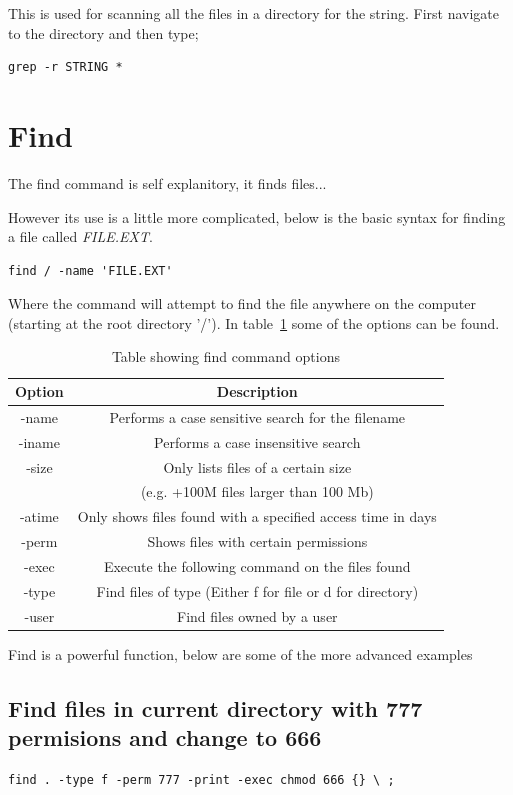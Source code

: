 This is used for scanning all the files in a directory for the string.  First navigate to the directory and then type;

\begin{lstlisting}
grep -r STRING *
\end{lstlisting}

\section{Find}

The find command is self explanitory, it finds files...

However its use is a little more complicated, below is the basic syntax for finding a file called \textit{FILE.EXT}.

\begin{lstlisting}
find / -name 'FILE.EXT'
\end{lstlisting}

Where the command will attempt to find the file anywhere on the computer (starting at the root directory '/').  In table~\ref{tab:find} some of the options can be found.

\begin{table}[!th]
\centering
\begin{tabular}{cc}
\hline
Option & Description\\
\hline
-name & Performs a case sensitive search for the filename\\
-iname & Performs a case insensitive search\\
-size & Only lists files of a certain size\\
 & (e.g. +100M files larger than 100 Mb)\\
-atime & Only shows files found with a specified access time in days\\
-perm & Shows files with certain permissions\\
-exec & Execute the following command on the files found\\
-type & Find files of type (Either f for file or d for directory)\\
-user & Find files owned by a user\\
\hline
\end{tabular}
\caption{Table showing find command options}
\label{tab:find}
\end{table}

Find is a powerful function, below are some of the more advanced examples

\subsection{Find files in current directory with 777 permisions and change to 666}
\begin{lstlisting}
find . -type f -perm 777 -print -exec chmod 666 {} \ ;
\end{lstlisting}

